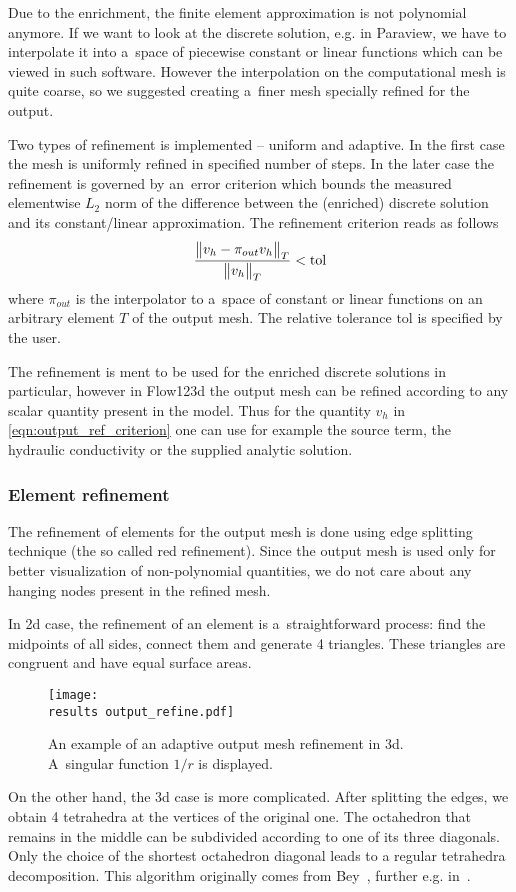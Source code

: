 Due to the enrichment, the finite element approximation is not polynomial anymore.
If we want to look at the discrete solution, e.g. in Paraview, we have to interpolate it into a~space of piecewise
constant or linear functions which can be viewed in such software. However the interpolation on the computational mesh
is quite coarse, so we suggested creating a~finer mesh specially refined for the output.

Two types of refinement is implemented -- uniform and adaptive. In the first case the mesh is uniformly refined in
specified number of steps. In the later case the refinement is governed by an~error criterion which bounds 
the measured elementwise $L_2$ norm of the difference between the (enriched) discrete solution and its constant/linear approximation.
The refinement criterion reads as follows
\begin{equation} \label{eqn:output_ref_criterion}
    \frac{\bigl\Vert v_h - \pi_{out}v_h\bigr\Vert_{T}}{\bigl\Vert v_h\bigr\Vert_{T}} < \textrm{tol}
\end{equation}
where $\pi_{out}$ is the interpolator to a~space of constant or linear functions on an arbitrary element $T$ of the output mesh.
The relative tolerance $\textrm{tol}$ is specified by the user.

The refinement is ment to be used for the enriched discrete solutions in particular, however in Flow123d the output mesh can be refined
according to any scalar quantity present in the model. Thus for the quantity $v_h$ in \eqref{eqn:output_ref_criterion} one can use
for example the source term, the hydraulic conductivity or the supplied analytic solution.

\subsubsection{Element refinement}
\label{sec:element_refinement}
The refinement of elements for the output mesh is done using edge splitting technique (the so called red refinement).
Since the output mesh is used only for better visualization of non-polynomial quantities, we do not
care about any hanging nodes present in the refined mesh.

In 2d case, the refinement of an element is a~straightforward process: find the midpoints of all sides, connect them and generate 4 triangles.
These triangles are congruent and have equal surface areas.
%
\begin{figure}[!htb]
    \centering    
    \texttt{[image: \\results output\_refine.pdf]} 
    \caption[output mesh refinement]
  {An example of an adaptive output mesh refinement in 3d.
  A~singular function $1/r$ is displayed.}
  \label{fig:output_refinement_flow123d}
\end{figure}
%
On the other hand, the 3d case is more complicated. After splitting the edges, we obtain 4 tetrahedra at the vertices
of the original one. The octahedron that remains in the middle can be subdivided according to one of its three diagonals.
Only the choice of the shortest octahedron diagonal leads to a regular tetrahedra decomposition.
This algorithm originally comes from Bey~\cite{bey_2000}, further e.g. in~\cite{brandts_2011}.

